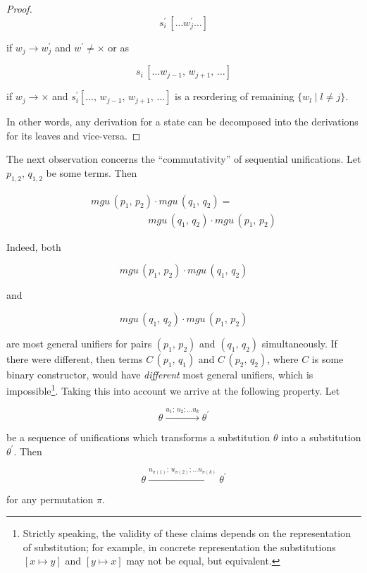 \begin{proof}
  \[
  s^\prime_i\,[\dots w^\prime_j\dots]
  \]
  

  if $w_j\to w^\prime_j$ and $w^\prime\ne\times$ or as
  
  \[
  s_i\,[\dots w_{j-1},\,w_{j+1},\,\dots]
  \]

  if $w_j\to\times$ and $s^\prime_i[\dots,\,w_{j-1},\,w_{j+1},\,\dots]$ is a reordering of remaining $\{w_l\mid l\ne j\}$.
  
  In other words, any derivation for a state can be decomposed into the derivations for its leaves and vice-versa.  
\end{proof}

The next observation concerns the ``commutativity'' of sequential unifications. Let $p_{1,2},\,q_{1,2}$ be some terms. Then

\[
\begin{array}{c}
  mgu\,(p_1,\,p_2)\cdot mgu\,(q_1,\,q_2)=\\
  \phantom{XXXXXXX}mgu\,(q_1,\,q_2)\cdot mgu\,(p_1,\,p_2)
\end{array}
\]

Indeed, both

\[
mgu\,(p_1,\,p_2)\cdot mgu\,(q_1,\,q_2)
\]

and

\[
mgu\,(q_1,\,q_2)\cdot mgu\,(p_1,\,p_2)
\]

are most general unifiers for pairs $(p_1,\,p_2)$ and $(q_1,\,q_2)$ simultaneously. If there were different, then terms $C\,(p_1,\,q_1)$ and
$C\,(p_2,\,q_2)$, where $C$ is some binary constructor, would have \emph{different} most general unifiers, which is impossible\footnote{Strictly
  speaking, the validity of these claims depends on the representation of substitution; for example, in concrete representation
  the substitutions $[x\mapsto y]$ and $[y\mapsto x]$ may not be equal, but equivalent.}. Taking this into account we arrive at the
following property. Let

\[
\theta\xrightarrow{u_1;\,u_2;\dots u_k}{\theta^\prime}
\]

be a sequence of unifications which transforms a substitution $\theta$ into a substitution $\theta^\prime$. Then

\[
\theta\xrightarrow{u_{\pi(1)};\,u_{\pi(2)};\dots u_{\pi(k)}}{\theta^\prime}
\]

for any permutation $\pi$.

